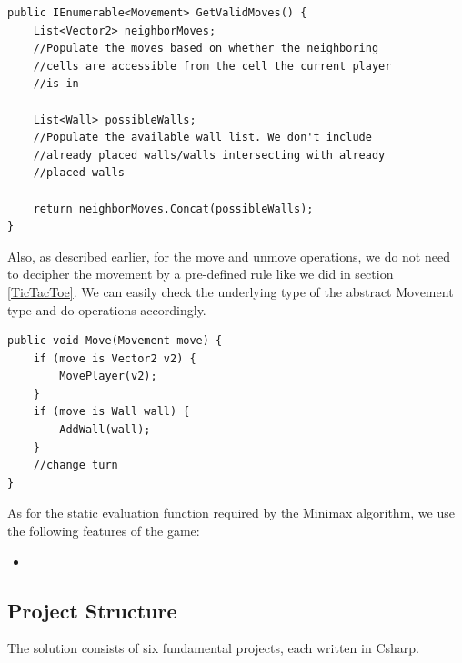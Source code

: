 \begin{lstlisting}
public IEnumerable<Movement> GetValidMoves() {
    List<Vector2> neighborMoves;
    //Populate the moves based on whether the neighboring
    //cells are accessible from the cell the current player
    //is in

    List<Wall> possibleWalls;
    //Populate the available wall list. We don't include
    //already placed walls/walls intersecting with already
    //placed walls

    return neighborMoves.Concat(possibleWalls);
}
\end{lstlisting}

Also, as described earlier, for the move and unmove operations, we do not need to decipher the movement by a pre-defined rule like we did in section \ref{TicTacToe}. We can easily check the underlying type of the abstract Movement type and do operations accordingly.

\begin{lstlisting}
public void Move(Movement move) {
    if (move is Vector2 v2) {
        MovePlayer(v2);
    }
    if (move is Wall wall) {
        AddWall(wall);
    }
    //change turn
}
\end{lstlisting}

As for the static evaluation function required by the Minimax algorithm, we use the following features of the game:
\begin{itemize}
    \item 
\end{itemize}

\subsection{Project Structure}

The solution consists of six fundamental projects, each written in \gls{Csharp}.

